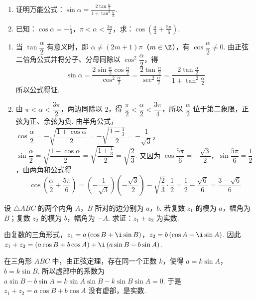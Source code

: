 \begin{problem}

\begin{enumerate}
\item 证明万能公式：\(\sin\alpha=\frac{2\tan\frac{\alpha}{2}}{1+\tan^2\frac{\alpha}{2}}\).

\item 已知：\(\cos\alpha=-\frac{1}{3}\)，\(\pi<\alpha<\frac{3\pi}{2}\)，求：\(\cos\left(\frac{\alpha}{2}+\frac{5\pi}{6}\right)\).
\end{enumerate}

\begin{solution}
\begin{enumerate}
\item 当 \(\tan\dfrac{\alpha}{2}\) 有意义时，即 \(\alpha\neq(2m+1)\pi\)（\(m\in\Z\)），有 \(\cos\dfrac{\alpha}{2}\neq0\). 由正弦二倍角公式并将分子、分母同除以 \(\cos^2\dfrac{\alpha}{2}\)，得
\[
\sin\alpha=\frac{2\sin\frac{\alpha}{2}\cos\frac{\alpha}{2}}{\cos^2\frac{\alpha}{2}}=\frac{2\tan\frac{\alpha}{2}}{\sec^2\frac{\alpha}{2}}=\frac{2\tan\frac{\alpha}{2}}{1+\tan^2\frac{\alpha}{2}}
\]
所以公式得证.
\item 由 \(\pi<\alpha<\dfrac{3\pi}{2}\)，两边同除以 \(2\)，得 \(\dfrac{\pi}{2}<\dfrac{\alpha}{2}<\dfrac{3\pi}{4}\)，所以 \(\dfrac{\alpha}{2}\) 位于第二象限，正弦为正、余弦为负. 由半角公式，
\(\cos\dfrac{\alpha}{2}=-\sqrt{\dfrac{1+\cos\alpha}{2}}=-\sqrt{\dfrac{1-\frac13}{2}}=-\dfrac{1}{\sqrt3}\)，
\(\sin\dfrac{\alpha}{2}=\sqrt{\dfrac{1-\cos\alpha}{2}}=\sqrt{\dfrac{1+\frac13}{2}}=\sqrt{\dfrac23}\).
又因为 \(\cos\dfrac{5\pi}{6}=-\dfrac{\sqrt3}{2}\)，\(\sin\dfrac{5\pi}{6}=\dfrac12\)，由两角和公式得
\[
\cos\left(\frac{\alpha}{2}+\frac{5\pi}{6}\right)=\left(-\frac{1}{\sqrt3}\right)\left(-\frac{\sqrt3}{2}\right)-\sqrt{\frac23}\cdot\frac12=\frac12-\frac{\sqrt6}{6}=\frac{3-\sqrt6}{6}
\]
\end{enumerate}
\end{solution}
\end{problem}

\begin{problem}

设 \(\triangle ABC\) 的两个内角 \(A\)，\(B\) 所对的边分别为 \(a\)，\(b\). 若复数 \(z_1\) 的模为 \(a\)，幅角为 \(B\)；复数 \(z_2\) 的模为 \(b\)，幅角为 \(-A\). 求证：\(z_1+z_2\) 为实数.

\begin{solution}
由复数的三角形式，\(z_1=a\left(\cos B+\i\sin B\right)\)，\(z_2=b\left(\cos A-\i\sin A\right)\). 因此 \(z_1+z_2=\left(a\cos B+b\cos A\right)+\i\left(a\sin B-b\sin A\right)\).

在三角形 \(ABC\) 中，由正弦定理，存在同一个正数 \(k\)，使得 \(a=k\sin A\)，\(b=k\sin B\). 所以虚部中的系数为 \(a\sin B-b\sin A=k\sin A\sin B-k\sin B\sin A=0\). 于是 \(z_1+z_2=a\cos B+b\cos A\) 没有虚部，是实数.
\end{solution}
\end{problem}

